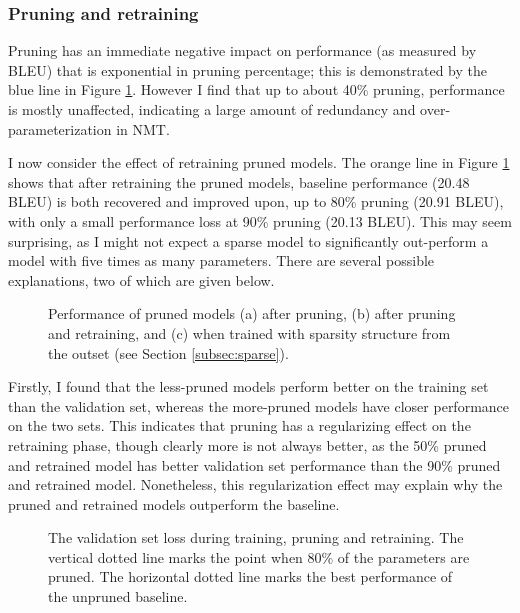 \subsubsection{Pruning and retraining}
\label{subsec:effect}


Pruning has an immediate negative impact on performance (as measured by BLEU) that is exponential in pruning percentage; this is demonstrated by the blue line in Figure \ref{fig:main_results}.
However I find that up to about 40\% pruning, performance is mostly unaffected, indicating a large amount of redundancy and over-parameterization in NMT.

I now consider the effect of retraining pruned models.
The orange line in Figure \ref{fig:main_results} shows that after retraining the pruned models, baseline performance (20.48 BLEU) is both recovered and improved upon, up to 80\% pruning (20.91 BLEU), with only a small performance loss at 90\% pruning (20.13 BLEU).
This may seem surprising, as I might not expect a sparse model to significantly out-perform a model with five times as many parameters.
There are several possible explanations, two of which are given below.
\begin{figure}
\centering

\caption[Performance of pruned models]{Performance of pruned models (a) after pruning, (b) after pruning and
retraining, and (c) when trained with sparsity structure from the outset (see
Section \ref{subsec:sparse}).}
\label{fig:main_results}
\end{figure}

Firstly, I found that the less-pruned models perform better on the training set than the validation set, whereas the more-pruned models have closer performance on the two sets. 
This indicates that pruning has a regularizing effect on the retraining phase, though clearly more is not always better, as the 50\% pruned and retrained model has better validation set performance than the 90\% pruned and retrained model.
Nonetheless, this regularization effect may explain why the pruned and retrained models outperform the baseline.
\begin{figure}[tbh]
\centering

\caption[Validation set losses during training, pruning and retraining]{The validation set loss during training, pruning and retraining. The vertical dotted line marks the point when 80\% of the parameters are pruned. The horizontal dotted line marks the best performance of the unpruned baseline.}

\label{fig:loss_curve}
\end{figure}

